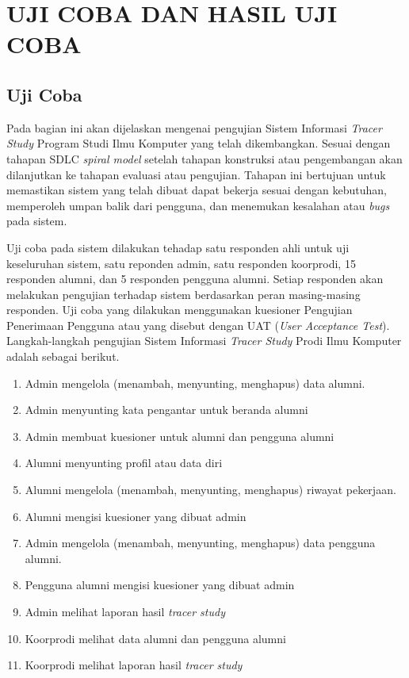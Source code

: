
\chapter{UJI COBA DAN HASIL UJI COBA}

\section{Uji Coba}
Pada bagian ini akan dijelaskan mengenai pengujian Sistem Informasi \textit{Tracer Study} Program Studi Ilmu Komputer yang telah dikembangkan. Sesuai dengan tahapan SDLC \textit{spiral model} setelah tahapan konstruksi atau pengembangan akan dilanjutkan ke tahapan evaluasi atau pengujian. Tahapan ini bertujuan untuk memastikan sistem yang telah dibuat dapat bekerja sesuai dengan kebutuhan, memperoleh umpan balik dari pengguna, dan menemukan kesalahan atau \textit{bugs} pada sistem. 

Uji coba pada sistem dilakukan tehadap satu responden ahli untuk uji keseluruhan sistem, satu reponden admin, satu responden koorprodi, 15 responden alumni, dan 5 responden pengguna alumni. Setiap responden akan melakukan pengujian terhadap sistem berdasarkan peran masing-masing responden. Uji coba yang dilakukan menggunakan kuesioner Pengujian Penerimaan Pengguna atau yang disebut dengan UAT (\textit{User Acceptance Test}). Langkah-langkah pengujian Sistem Informasi \textit{Tracer Study} Prodi Ilmu Komputer adalah sebagai berikut. 

\begin{enumerate}
	\item Admin mengelola (menambah, menyunting, menghapus) data alumni. 
	\item Admin menyunting kata pengantar untuk beranda alumni
	\item Admin membuat kuesioner untuk alumni dan pengguna alumni
	\item Alumni menyunting profil atau data diri
	\item Alumni mengelola  (menambah, menyunting, menghapus) riwayat pekerjaan. 
	\item Alumni mengisi kuesioner yang dibuat admin
	\item Admin mengelola (menambah, menyunting, menghapus) data pengguna alumni.
	\item Pengguna alumni mengisi kuesioner yang dibuat admin
	\item Admin melihat laporan hasil \textit{tracer study}
	\item Koorprodi melihat data alumni dan pengguna alumni
	\item Koorprodi melihat laporan hasil \textit{tracer study}
\end{enumerate}

